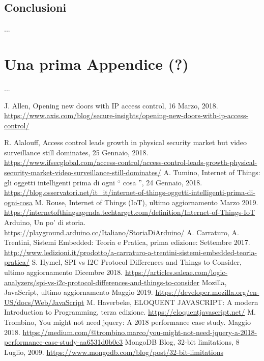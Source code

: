 \documentclass[12pt]{report}
\begin{document}
%
\section{Conclusioni}
%
...
\appendix
\chapter{Una prima Appendice (?)}
...


%
\begin{thebibliography}{00}
%
%	

J. Allen, Opening new doors with IP access control, 16 Marzo, 2018. \url{https://www.axis.com/blog/secure-insights/opening-new-doors-with-ip-access-control/}
%

R. Alalouff, Access control leads growth in physical security market but video surveillance still dominates, 25 Gennaio, 2018.
\url{https://www.ifsecglobal.com/access-control/access-control-leads-growth-physical-security-market-video-surveillance-still-dominates/}
%
A. Tumino, Internet of Things: gli oggetti intelligenti prima di ogni \textquotedblleft{} cosa \textquotedblright{}, 24 Gennaio, 2018.
\url{https://blog.osservatori.net/it_it/internet-of-things-oggetti-intelligenti-prima-di-ogni-cosa}
%
M. Rouse, Internet of Things (IoT), ultimo aggiornamento Marzo 2019.
\url{https://internetofthingsagenda.techtarget.com/definition/Internet-of-Things-IoT}
% 
Arduino, Un po' di storia.
\url{https://playground.arduino.cc/Italiano/StoriaDiArduino/}
%
A. Carraturo, A. Trentini, Sistemi Embedded: Teoria e Pratica, prima edizione: Settembre 2017.
\url{http://www.ledizioni.it/prodotto/a-carraturo-a-trentini-sistemi-embedded-teoria-pratica/}
%
S. Hymel, SPI vs I2C Protocol Differences and Things to Consider, ultimo aggiornamento Dicembre 2018.
\url{https://articles.saleae.com/logic-analyzers/spi-vs-i2c-protocol-differences-and-things-to-consider}
%
Mozilla, JavaScript, ultimo aggiornamento Maggio 2019.
\url{https://developer.mozilla.org/en-US/docs/Web/JavaScript}
%
M. Haverbeke, ELOQUENT JAVASCRIPT: A modern Introduction to Programming, terza edizione.
\url{https://eloquentjavascript.net/}
%
M. Trombino, You might not need jquery: A 2018 performance
case study. Maggio 2018. 
\url{https://medium.com/@trombino.marco/you-might-not-need-jquery-a-2018-performance-case-study-aa6531d0b0c3}
%
MongoDB Blog, 32-bit limitations, 8 Luglio, 2009.
\url{https://www.mongodb.com/blog/post/32-bit-limitations}
\end{thebibliography}
%
\end{document}
